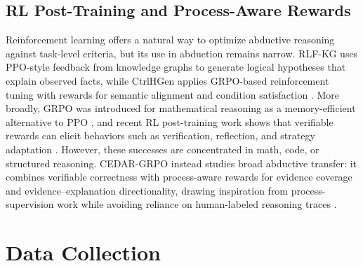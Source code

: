 \documentclass[11pt]{article}
\begin{document}

\subsection{RL Post-Training and Process-Aware Rewards}

Reinforcement learning offers a natural way to optimize abductive reasoning against task-level criteria, but its use in abduction remains narrow. RLF-KG uses PPO-style feedback from knowledge graphs to generate logical hypotheses that explain observed facts, while CtrlHGen applies GRPO-based reinforcement tuning with rewards for semantic alignment and condition satisfaction \citep{bai2023abductive-kg,gao2025ctrlhgen}. More broadly, GRPO was introduced for mathematical reasoning as a memory-efficient alternative to PPO \citep{shao2024deepseekmath}, and recent RL post-training work shows that verifiable rewards can elicit behaviors such as verification, reflection, and strategy adaptation \citep{guo2025deepseekr1}. However, these successes are concentrated in math, code, or structured reasoning. CEDAR-GRPO instead studies broad abductive transfer: it combines verifiable correctness with process-aware rewards for evidence coverage and evidence--explanation directionality, drawing inspiration from process-supervision work while avoiding reliance on human-labeled reasoning traces \citep{lightman2024lets,uesato2022solving}.


\section{Data Collection}
\label{sec:data_collection}
\end{document}
